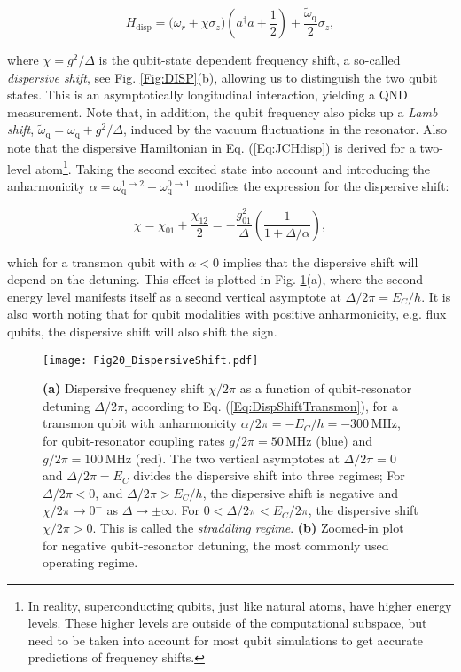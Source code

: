 \documentclass[aip,apr,twocolumn,showpacs,superscriptaddress,groupedaddress,nofootinbib,reprint]{revtex4-1}  %
\newcommand{\freq}{\omega_\text{q}}
\begin{document}
\begin{equation}
H_{\text{disp}} = \bigg( \omega_r +\chi\sigma_z\bigg) \left( a^{\dagger}a + \frac{1}{2}\right) + \frac{\widetilde{\omega}_{\text{q}}}{2}\sigma_z,
\label{Eq:JCHdisp}
\end{equation}

\noindent where $\chi = g^2/\Delta$ is the qubit-state dependent frequency shift, a so-called \textit{dispersive shift}, see Fig. \ref{Fig:DISP}(b), allowing us to distinguish the two qubit states. This is an asymptotically longitudinal interaction, yielding a QND measurement. Note that, in addition, the qubit frequency also picks up a \textit{Lamb shift}, $\widetilde{\omega}_{\text{q}} = \freq + g^2/\Delta$, induced by the vacuum fluctuations in the resonator. Also note that the dispersive Hamiltonian in Eq. (\ref{Eq:JCHdisp}) is derived for a two-level atom\footnote{In reality, superconducting qubits, just like natural atoms, have higher energy levels. These higher levels are outside of the computational subspace, but need to be taken into account for most qubit simulations to get accurate predictions of frequency shifts.}. Taking the second excited state into account and introducing the anharmonicity $\alpha = \omega_{\text{q}}^{1\rightarrow 2} - \omega_{\text{q}}^{0\rightarrow 1}$ modifies the expression for the dispersive shift:

\begin{equation}
\chi = \chi_{01} + \frac{\chi_{12}}{2} = -\frac{g_{01}^2}{\Delta}\left(\frac{1}{1 + \Delta/\alpha}\right),
\label{Eq:DispShiftTransmon}
\end{equation}

\noindent which for a transmon qubit with $\alpha < 0$ implies that the dispersive shift will depend on the detuning. This effect is plotted in Fig. \ref{Fig:DispersiveShift}(a), where the second energy level manifests itself as a second vertical asymptote at $\Delta/2\pi = E_C/h$. It is also worth noting that for qubit modalities with positive anharmonicity, e.g. flux qubits, the dispersive shift will also shift the sign\cite{Yan2016}.

\begin{figure}[!t]
\begin{center}
\texttt{[image: Fig20\_DispersiveShift.pdf]}
\caption{\textbf{(a)} Dispersive frequency shift $\chi/2\pi$ as a function of qubit-resonator detuning $\Delta/2\pi$, according to Eq. (\ref{Eq:DispShiftTransmon}), for a transmon qubit with anharmonicity $\alpha/2\pi = -E_C/h = -300\,$MHz, for qubit-resonator coupling rates $g/2\pi = 50\,$MHz (blue) and $g/2\pi = 100\,$MHz (red). The two vertical asymptotes at $\Delta/2\pi = 0$ and $\Delta/2\pi = E_C$ divides the dispersive shift into three regimes; For $\Delta/2\pi < 0$, and $\Delta/2\pi > E_C/h$, the dispersive shift is negative and $\chi/2\pi \rightarrow 0^{-}$ as $\Delta\rightarrow \pm \infty$. For $0<\Delta/2\pi < E_C/2\pi$, the dispersive shift $\chi/2\pi > 0$. This is called the \textit{straddling regime}\cite{Koch2007}. \textbf{(b)} Zoomed-in plot for negative qubit-resonator detuning, the most commonly used operating regime.}
\label{Fig:DispersiveShift}
\end{center}
\end{figure}
\end{document}
